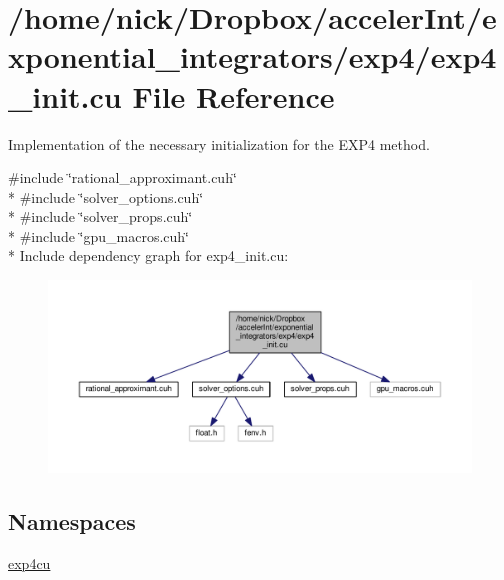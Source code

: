 \hypertarget{exp4__init_8cu}{}\section{/home/nick/\+Dropbox/acceler\+Int/exponential\+\_\+integrators/exp4/exp4\+\_\+init.cu File Reference}
\label{exp4__init_8cu}


Implementation of the necessary initialization for the E\+X\+P4 method.  


{\ttfamily \#include \char`\"{}rational\+\_\+approximant.\+cuh\char`\"{}}\\*
{\ttfamily \#include \char`\"{}solver\+\_\+options.\+cuh\char`\"{}}\\*
{\ttfamily \#include \char`\"{}solver\+\_\+props.\+cuh\char`\"{}}\\*
{\ttfamily \#include \char`\"{}gpu\+\_\+macros.\+cuh\char`\"{}}\\*
Include dependency graph for exp4\+\_\+init.\+cu\+:
\nopagebreak
\begin{figure}[H]
\begin{center}
\leavevmode
\includegraphics[width=350pt]{exp4__init_8cu__incl}
\end{center}
\end{figure}
\subsection*{Namespaces}
\begin{DoxyCompactItemize}
\item 
 \hyperlink{namespaceexp4cu}{exp4cu}
\end{DoxyCompactItemize}
